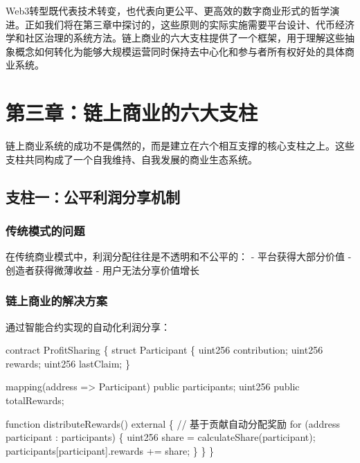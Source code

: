 \documentclass[
  Letterpaper,
]{scrbook}
\newenvironment{Shaded}{\begin{snugshade}}{\end{snugshade}}
\newcommand{\NormalTok}[1]{\textcolor[rgb]{0.00,0.23,0.31}{#1}}
\begin{document}
Web3转型既代表技术转变，也代表向更公平、更高效的数字商业形式的哲学演进。正如我们将在第三章中探讨的，这些原则的实际实施需要平台设计、代币经济学和社区治理的系统方法。链上商业的六大支柱提供了一个框架，用于理解这些抽象概念如何转化为能够大规模运营同时保持去中心化和参与者所有权好处的具体商业系统。

\chapter{第三章：链上商业的六大支柱}\label{sec-six-pillars}

链上商业系统的成功不是偶然的，而是建立在六个相互支撑的核心支柱之上。这些支柱共同构成了一个自我维持、自我发展的商业生态系统。

\section{支柱一：公平利润分享机制}\label{ux652fux67f1ux4e00ux516cux5e73ux5229ux6da6ux5206ux4eabux673aux5236}

\subsection{传统模式的问题}\label{ux4f20ux7edfux6a21ux5f0fux7684ux95eeux9898}

在传统商业模式中，利润分配往往是不透明和不公平的： - 平台获得大部分价值
- 创造者获得微薄收益 - 用户无法分享价值增长

\subsection{链上商业的解决方案}\label{ux94feux4e0aux5546ux4e1aux7684ux89e3ux51b3ux65b9ux6848}

通过智能合约实现的自动化利润分享：

\begin{Shaded}
\begin{Highlighting}[]
\NormalTok{contract ProfitSharing \{}
\NormalTok{    struct Participant \{}
\NormalTok{        uint256 contribution;}
\NormalTok{        uint256 rewards;}
\NormalTok{        uint256 lastClaim;}
\NormalTok{    \}}
    
\NormalTok{    mapping(address =\textgreater{} Participant) public participants;}
\NormalTok{    uint256 public totalRewards;}
    
\NormalTok{    function distributeRewards() external \{}
\NormalTok{        // 基于贡献自动分配奖励}
\NormalTok{        for (address participant : participants) \{}
\NormalTok{            uint256 share = calculateShare(participant);}
\NormalTok{            participants[participant].rewards += share;}
\NormalTok{        \}}
\NormalTok{    \}}
\NormalTok{\}}
\end{Highlighting}
\end{Shaded}
\end{document}

